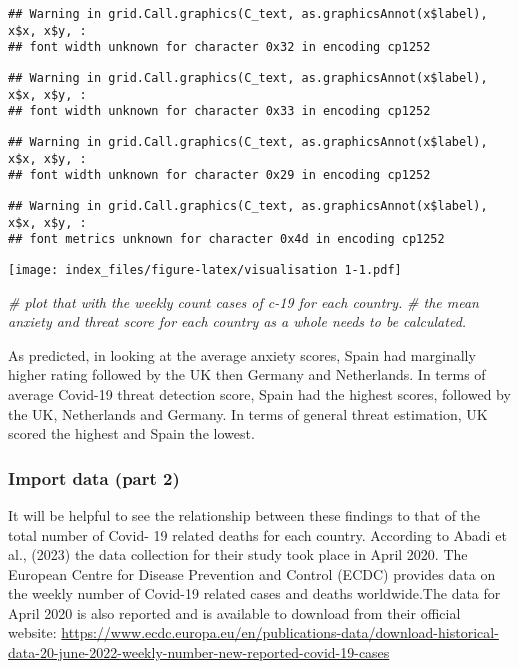 \documentclass[
]{article}
\newenvironment{Shaded}{\begin{snugshade}}{\end{snugshade}}
\newcommand{\CommentTok}[1]{\textcolor[rgb]{0.56,0.35,0.01}{\textit{#1}}}
\begin{document}
\begin{verbatim}
## Warning in grid.Call.graphics(C_text, as.graphicsAnnot(x$label), x$x, x$y, :
## font width unknown for character 0x32 in encoding cp1252
\end{verbatim}

\begin{verbatim}
## Warning in grid.Call.graphics(C_text, as.graphicsAnnot(x$label), x$x, x$y, :
## font width unknown for character 0x33 in encoding cp1252
\end{verbatim}

\begin{verbatim}
## Warning in grid.Call.graphics(C_text, as.graphicsAnnot(x$label), x$x, x$y, :
## font width unknown for character 0x29 in encoding cp1252
\end{verbatim}

\begin{verbatim}
## Warning in grid.Call.graphics(C_text, as.graphicsAnnot(x$label), x$x, x$y, :
## font metrics unknown for character 0x4d in encoding cp1252
\end{verbatim}

\texttt{[image: index\_files/figure-latex/visualisation 1-1.pdf]}

\begin{Shaded}
\begin{Highlighting}[]
\CommentTok{\# plot that with the weekly count cases of c{-}19 for each country. }
\CommentTok{\# the mean anxiety and threat score for each country as a whole needs to be calculated. }
\end{Highlighting}
\end{Shaded}

As predicted, in looking at the average anxiety scores, Spain had
marginally higher rating followed by the UK then Germany and
Netherlands. In terms of average Covid-19 threat detection score, Spain
had the highest scores, followed by the UK, Netherlands and Germany. In
terms of general threat estimation, UK scored the highest and Spain the
lowest.

\subsubsection{Import data (part 2)}\label{import-data-part-2}

It will be helpful to see the relationship between these findings to
that of the total number of Covid- 19 related deaths for each country.
According to Abadi et al., (2023) the data collection for their study
took place in April 2020. The European Centre for Disease Prevention and
Control (ECDC) provides data on the weekly number of Covid-19 related
cases and deaths worldwide.The data for April 2020 is also reported and
is available to download from their official website:
\url{https://www.ecdc.europa.eu/en/publications-data/download-historical-data-20-june-2022-weekly-number-new-reported-covid-19-cases}
\end{document}
